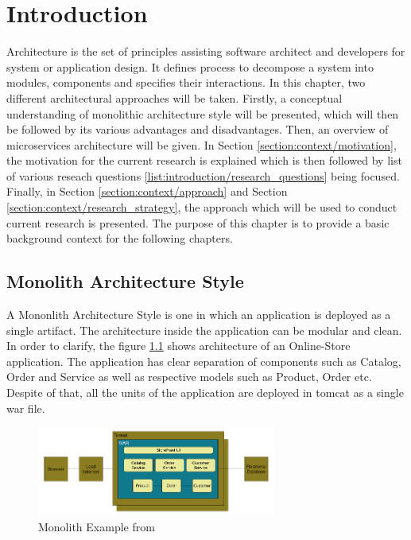 \chapter{Introduction}\label{chapter:introduction}
Architecture is the set of principles assisting software architect and developers for system or application design. \cite{Dashofy:2009aa} It defines process to decompose a system into modules, components and specifies their interactions. \cite{Brown:2015aa} In this chapter, two different architectural approaches will be taken. Firstly, a conceptual understanding of monolithic architecture style will be presented, which will then be followed by its various advantages and disadvantages. Then, an overview of microservices architecture will be given. In Section \ref{section:context/motivation}, the motivation for the current research is explained which is then followed by  list of various reseach questions \ref{list:introduction/research_questions} being focused. Finally, in Section \ref{section:context/approach} and Section \ref{section:context/research_strategy}, the approach which will be used to conduct current research is presented. The purpose of this chapter is to provide a basic background context for the following chapters.

\section{Monolith Architecture Style}\label{section:context/monolith}
A Mononlith Architecture Style is one in which an application is deployed as a single artifact. The architecture inside the application can be modular and clean. In order to clarify, the figure \ref{fig:context/monolith-example} shows architecture of an Online-Store application. The application has clear separation of components such as Catalog, Order and Service as well as respective models such as Product, Order etc. Despite of that, all the units of the application are deployed in tomcat as a single war file.\cite{Richardson:2014aa}\cite{Richardson:2014ab}

\begin{figure}[H]
\begin{center}
\includegraphics[width=0.7\textwidth]{figures/context-monolith-example}
\caption{Monolith Example from \cite{Richardson:2014aa}}
\label{fig:context/monolith-example}
\end{center}
\end{figure}

